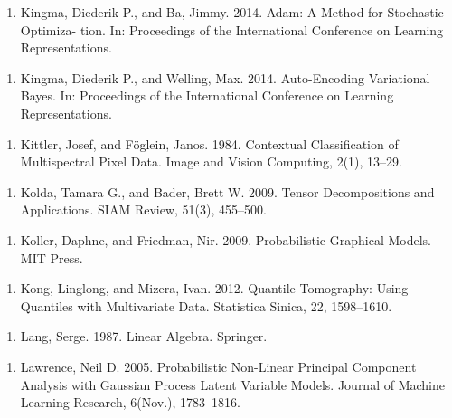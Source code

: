 \begin{enumerate}
\item Kingma, Diederik P., and Ba, Jimmy. 2014. Adam: A Method for Stochastic Optimiza- tion. In: Proceedings of the International Conference on Learning Representations.
\end{enumerate}

\begin{enumerate}
\item Kingma, Diederik P., and Welling, Max. 2014. Auto-Encoding Variational Bayes. In: Proceedings of the International Conference on Learning Representations.
\end{enumerate}

\begin{enumerate}
\item Kittler, Josef, and Föglein, Janos. 1984. Contextual Classiﬁcation of Multispectral Pixel Data. Image and Vision Computing, 2(1), 13–29.
\end{enumerate}

\begin{enumerate}
\item Kolda, Tamara G., and Bader, Brett W. 2009. Tensor Decompositions and Applications. SIAM Review, 51(3), 455–500.
\end{enumerate}

\begin{enumerate}
\item Koller, Daphne, and Friedman, Nir. 2009. Probabilistic Graphical Models. MIT Press.
\end{enumerate}

\begin{enumerate}
\item Kong, Linglong, and Mizera, Ivan. 2012. Quantile Tomography: Using Quantiles with Multivariate Data. Statistica Sinica, 22, 1598–1610.
\end{enumerate}

\begin{enumerate}
\item Lang, Serge. 1987. Linear Algebra. Springer.
\end{enumerate}

\begin{enumerate}
\item Lawrence, Neil D. 2005. Probabilistic Non-Linear Principal Component Analysis with Gaussian Process Latent Variable Models. Journal of Machine Learning Research, 6(Nov.), 1783–1816.
\end{enumerate}

